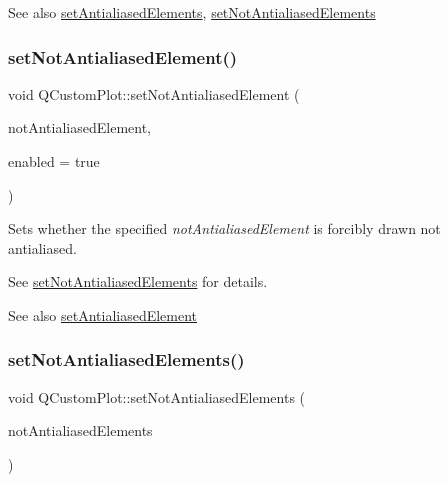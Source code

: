 \begin{DoxySeeAlso}{See also}
\mbox{\hyperlink{class_q_custom_plot_af6f91e5eab1be85f67c556e98c3745e8}{set\+Antialiased\+Elements}}, \mbox{\hyperlink{class_q_custom_plot_ae10d685b5eabea2999fb8775ca173c24}{set\+Not\+Antialiased\+Elements}} 
\end{DoxySeeAlso}
\mbox{\label{class_q_custom_plot_afc657938a707c890e449ae89203a076d}} 
\subsubsection{\texorpdfstring{set\+Not\+Antialiased\+Element()}{setNotAntialiasedElement()}}
{\footnotesize\ttfamily void Q\+Custom\+Plot\+::set\+Not\+Antialiased\+Element (\begin{DoxyParamCaption}\item[{\mbox{\hyperlink{namespace_q_c_p_ae55dbe315d41fe80f29ba88100843a0c}{Q\+C\+P\+::\+Antialiased\+Element}}}]{not\+Antialiased\+Element,  }\item[{bool}]{enabled = {\ttfamily true} }\end{DoxyParamCaption})}

Sets whether the specified {\itshape not\+Antialiased\+Element} is forcibly drawn not antialiased.

See \mbox{\hyperlink{class_q_custom_plot_ae10d685b5eabea2999fb8775ca173c24}{set\+Not\+Antialiased\+Elements}} for details.

\begin{DoxySeeAlso}{See also}
\mbox{\hyperlink{class_q_custom_plot_aeef813bcf7efab8e765f9f87ec454691}{set\+Antialiased\+Element}} 
\end{DoxySeeAlso}
\mbox{\label{class_q_custom_plot_ae10d685b5eabea2999fb8775ca173c24}} 
\subsubsection{\texorpdfstring{set\+Not\+Antialiased\+Elements()}{setNotAntialiasedElements()}}
{\footnotesize\ttfamily void Q\+Custom\+Plot\+::set\+Not\+Antialiased\+Elements (\begin{DoxyParamCaption}\item[{const Q\+C\+P\+::\+Antialiased\+Elements \&}]{not\+Antialiased\+Elements }\end{DoxyParamCaption})}

